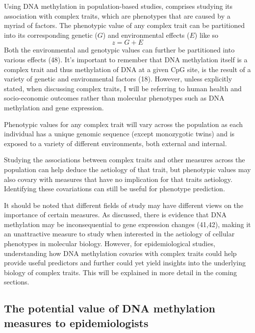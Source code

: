 \documentclass[11pt,oneside]{bristolthesis}
\begin{document}
Using DNA methylation in population-based studies, comprises studying its association with complex traits, which are phenotypes that are caused by a myriad of factors. The phenotypic value of any complex trait can be partitioned into its corresponding genetic (\(G\)) and environmental effects (\(E\)) like so
\begin{equation}
    z = G + E
    \label{eq:phenotypic-values}
\end{equation}
Both the environmental and genotypic values can further be partitioned into various effects (48). It's important to remember that DNA methylation itself is a complex trait and thus methylation of DNA at a given CpG site, is the result of a variety of genetic and environmental factors (18). However, unless explicitly stated, when discussing complex traits, I will be referring to human health and socio-economic outcomes rather than molecular phenotypes such as DNA methylation and gene expression.

Phenotypic values for any complex trait will vary across the population as each individual has a unique genomic sequence (except monozygotic twins) and is exposed to a variety of different environments, both external and internal.

Studying the associations between complex traits and other measures across the population can help deduce the aetiology of that trait, but phenotypic values may also covary with measures that have no implication for that traits aetiology. Identifying these covariations can still be useful for phenotype prediction.

It should be noted that different fields of study may have different views on the importance of certain measures. As discussed, there is evidence that DNA methylation may be inconsequential to gene expression changes (41,42), making it an unattractive measure to study when interested in the aetiology of cellular phenotypes in molecular biology. However, for epidemiological studies, understanding how DNA methylation covaries with complex traits could help provide useful predictors and further could yet yield insights into the underlying biology of complex traits. This will be explained in more detail in the coming sections.

\hypertarget{appeal-of-dnam}{%
\subsection{The potential value of DNA methylation measures to epidemiologists}\label{appeal-of-dnam}}
\end{document}
